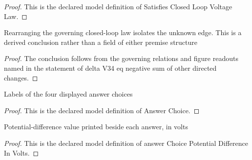 \begin{proof}
  This is the declared model definition of Satisfies Closed Loop Voltage Law.
\end{proof}
\begin{lemma}
  \label{lem:physics:phyx-mini-0872:phyxminiproblems-problemphyxmini0872-deltav34-eq-negative-sum-of-other-directed-changes}
  Rearranging the governing closed-loop law isolates the unknown edge. This is a derived conclusion rather than a field of either premise structure
\end{lemma}
\begin{proof}
  The conclusion follows from the governing relations and figure readouts named in the statement of delta V34 eq negative sum of other directed changes.
\end{proof}
\begin{definition}
  \label{def:physics:phyx-mini-0872:phyxminiproblems-problemphyxmini0872-answerchoice}
  Labels of the four displayed answer choices
\end{definition}
\begin{proof}
  This is the declared model definition of Answer Choice.
\end{proof}
\begin{definition}
  \label{def:physics:phyx-mini-0872:phyxminiproblems-problemphyxmini0872-answerchoicepotentialdifferenceinvolts}
  Potential-difference value printed beside each answer, in volts
\end{definition}
\begin{proof}
  This is the declared model definition of answer Choice Potential Difference In Volts.
\end{proof}
